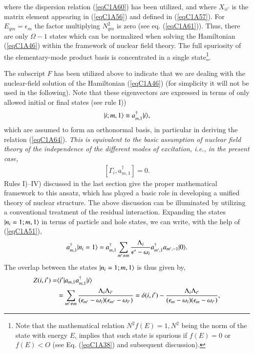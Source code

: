 where the dispersion relation (\ref{eqC1A60}) has been utilized, and where $X_{ii'}$ is the matrix element appearing in (\ref{eqC1A56}) and defined in (\ref{eqC1A57}). For $E_{qm}=\epsilon_m$ the factor multiplying $N^2_{qm}$ is zero (see eq. (\ref{eqC1A61})). Thus, there are only $\Omega-1$ states which can be normalized when solving the Hamiltonian (\ref{eqC1A46}) within the framework of  nuclear field theory. The full spuriosity of the elementary-mode product basis is concentrated in a single state\footnote{ Note that the mathematical relation $N^2f(E)=1, N^2$ being the norm of the state with energy $E$, implies that such state is spurious if $f(E)= 0$ or $f(E)<O$ (see Eq. (\ref{eqC1A38}) and subsequent discussion).}.

 
The subscript $F$ has been utilized above to indicate that we are dealing with the nuclear-field solution of the Hamiltonian (\ref{eqC1A46}) (for simplicity it will not be used in the following). Note that these eigenvectors are expressed in terms of only  allowed initial or final states (see rule I)) 
\begin{align}\label{eqC1A65} 
 |{i;m,1} \rangle\equiv a^\dagger_{m,1}|{i} \rangle,
  \end{align}
which are assumed to form an orthonormal basis, in particular in deriving the 
relation (\ref{eqC1A64}). \textit{This is equivalent to the basic assumption of  nuclear field theory of the independence of the different modes of excitation, i.e., in the 
present case, }
\begin{align}\label{eqC1A66} 
 [\Gamma_i,a^\dagger_{m,1}]=0.
  \end{align}
Rules I)--IV) discussed in the last section give the proper mathematical framework to this ansatz, which has played a basic role in developing a unified theory of nuclear structure. 
The above discussion can be illuminated by utilizing a conventional treatment of the residual interaction. Expanding the states $|{n_i=1; m,1} \rangle$
in terms of particle and hole states, we can write, with the help of (\ref{eqC1A51}), 
\begin{align}\label{eqC1A66b} 
 a^\dagger_{m,1}|{n_i=1} \rangle=a^\dagger_{m,1}\sum_{m'\neq m}\frac{\Lambda_i}{\epsilon'-\omega_i}a^\dagger_{m',1}a_{m',-1}|{0} \rangle.
  \end{align}
The overlap between the states $|{n_i=1; m,1} \rangle$ is thus given by, 
\begin{align}\label{eqC1A67} 
 \nonumber Z(i,i')=&\langle {i'|a_{m,1}a^\dagger_{m,1}|i} \rangle\\
 &=\sum_{m'\neq m}\frac{\Lambda_i\Lambda_{i'}}{(\epsilon_{m'}-\omega_i)(\epsilon_{m'}-\omega_{i'})}=\delta(i,i')-\frac{\Lambda_i\Lambda_{i'}}{(\epsilon_m-\omega_i)(\epsilon_m-\omega_{i'})},
  \end{align}
